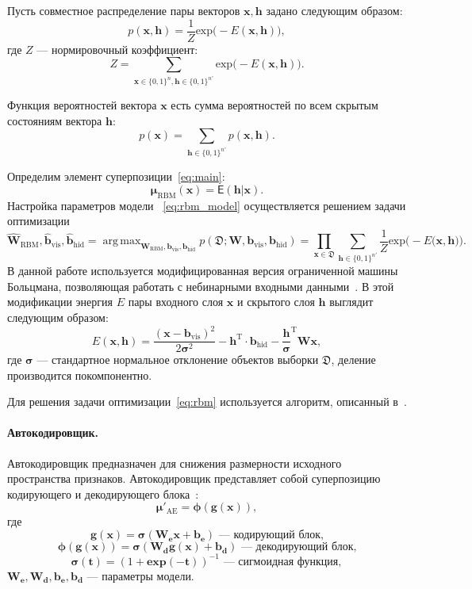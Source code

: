 \documentclass[12pt]{article}
\DeclareMathOperator*{\argmax}{arg\,max}
\begin{document}
Пусть совместное распределение пары векторов $\mathbf{x}, \mathbf{h}$ задано следующим образом:
\[
	p(\mathbf{x}, \mathbf{h}) = \frac{1}{Z} \text{exp}\bigl(-E(\mathbf{x},\mathbf{h})\bigr),
\]
где $Z$ --- нормировочный коэффициент:
\[
 Z = \sum_{\mathbf{x} \in \{0,1\}^n, \mathbf{h}\in \{0,1\}^{n'}} \text{exp}\bigl(-E(\mathbf{x},\mathbf{h})\bigr).
\]


Функция вероятностей вектора $\mathbf{x}$ есть сумма вероятностей по всем скрытым состояниям вектора $\mathbf{h}$:
\[
	p(\mathbf{x}) = \sum_{\mathbf{h}\in \{0,1\}^{n'}} p(\mathbf{x}, \mathbf{h}).
\]

Определим элемент суперпозиции~\eqref{eq:main}: \begin{equation}
\label{eq:rbm_model}
\boldsymbol{\mu}_\text{RBM}(\mathbf{x}) = \mathsf{E}(\mathbf{h}|\mathbf{x}).
\end{equation}
Настройка параметров модели ~\eqref{eq:rbm_model} осуществляется решением задачи оптимизации
\begin{equation}
\label{eq:rbm}
\hat{\mathbf{W}}_\text{RBM},\hat{\mathbf{b}}_\text{vis}, \hat{\mathbf{b}}_\text{hid} = \argmax_{{\mathbf{W}_\text{RBM}},{\mathbf{b}}_\text{vis}, {\mathbf{b}}_\text{hid} } p(\mathfrak{D}; {\mathbf{W}},{\mathbf{b}_\text{vis}},{\mathbf{b}_\text{hid}}) = \prod_{\mathbf{x} \in \mathfrak{D}} \sum_{\mathbf{h}\in \{0,1\}^{n'}} \frac{1}{Z} \text{exp}\bigl(-E(\mathbf{\mathbf{x}},\mathbf{h)}\bigr).
\end{equation}
В данной работе используется модифицированная версия ограниченной машины Больцмана, позволяющая работать с небинарными входными данными~\cite{gbrbm}. В этой модификации энергия $E$ пары входного слоя $\mathbf{x}$ и скрытого слоя $\mathbf{h}$ выглядит следующим образом:
\[
E(\mathbf{x},\mathbf{h}) = \frac{(\mathbf{x} - \mathbf{b}_\text{vis})^2}{2\boldsymbol{\sigma}^2} -\mathbf{h}^\text{T} \cdot \mathbf{b}_\text{hid} - \frac{\mathbf{h}}{\boldsymbol{\sigma}}^\text{T}\mathbf{W}\mathbf{x},
\]
где $\boldsymbol{\sigma}$ --- стандартное нормальное отклонение объектов выборки $\mathfrak{D}$, деление производится покомпонентно.

Для решения задачи оптимизации~\eqref{eq:rbm} используется алгоритм, описанный в~\cite{foundamentals}.

\paragraph{Автокодировщик.}
Автокодировщик предназначен для снижения размерности исходного пространства признаков.
Автокодировщик представляет собой суперпозицию кодирующего и декодирующего блока~\cite{foundamentals}:
\[
 \mathbf{\boldsymbol{\mu}}'_\text{AE} = \boldsymbol{\phi}(\mathbf{g}(\mathbf{x})),
\]
где $$\mathbf{g}(\mathbf{x}) = \boldsymbol{\sigma}(\mathbf{W}_\textbf{e}\mathbf{x}+\mathbf{b}_\textbf{e}) \text{ --- кодирующий блок,}$$
$$ \boldsymbol{\phi}(\mathbf{g}(\mathbf{x})) = \boldsymbol{\sigma}(\mathbf{W}_\textbf{d}\mathbf{g}(\mathbf{x})+\mathbf{b}_\textbf{d})\text{ --- декодирующий блок,}$$ $$\boldsymbol{\sigma}(\mathbf{t}) = (1+\textbf{exp}({-\mathbf{t}}))^{-1} \text{ --- сигмоидная функция},$$ $\mathbf{W}_\textbf{e},\mathbf{W}_\textbf{d},\mathbf{b}_\textbf{e}, \mathbf{b}_\textbf{d}$ --- параметры модели.
\end{document}

